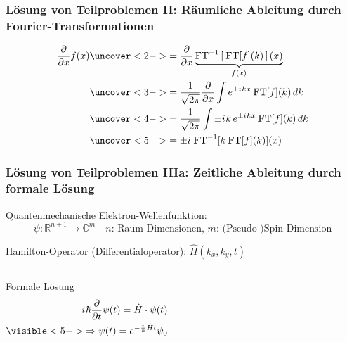 \documentclass{beamer}
\newcommand{\iu}{{i\mkern1mu}} 	%
\newcommand{\FT}{\mathrm{FT}}
\newcommand{\absatz}{\vskip3mm}
\begin{document}
\begin{frame}[t] %
  \frametitle{Lösung von Teilproblemen II: Räumliche Ableitung durch Fourier-Transformationen}
  \begin{align*}
  \frac{\partial }{\partial x}f(x)
      &\uncover<2->{= \frac{\partial }{\partial x} \underbrace{\FT^{-1}\left[\: \FT[f](k) \, \right](x)}_{f(x)} }  \\
      &\uncover<3->{= \frac{1}{\sqrt{2\pi}} \frac{\partial }{\partial x}  \int e^{\pm \iu kx} \:\FT[f](k) \,dk }\\
      &\uncover<4->{= \frac{1}{\sqrt{2\pi}}  \int \pm \iu k\, e^{\pm \iu kx} \:\FT[f](k) \,dk }\\
      &\uncover<5->{=\pm \iu \:\FT^{-1} [k \:\FT[f](k)] (x) }
  \end{align*}

  
  \absatz

\end{frame}


\begin{frame}[t] %
  \frametitle{Lösung von Teilproblemen IIIa: Zeitliche Ableitung durch formale Lösung}
 Quantenmechanische Elektron-Wellenfunktion: \begin{equation*}\psi: \mathbb{R}^{n+1} \rightarrow \mathbb{C}^m \quad \text{$n$: Raum-Dimensionen, $m$: (Pseudo-)Spin-Dimension}\end{equation*}

 Hamilton-Operator (Differentialoperator): $\hat{H}(k_x, k_y, t)$

 \begin{columns}
 \begin{block}{Formale Lösung}
  \begin{align*}
    \iu \hbar \frac{\partial}{\partial t}  \psi(t) = \hat{H} \cdot \psi(t)  \\
    \visible<5->{\Rightarrow  \psi(t) = e^{-\frac{\iu}{\hbar}\hat{H}t} \psi_0}
  \end{align*}
    \end{block}
    
     
  \end{columns}
\end{frame}
\end{document}
